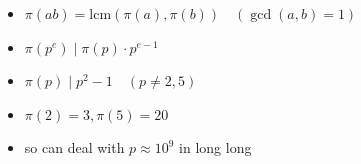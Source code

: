\begin{itemize}
	\item $\pi (ab) = \text{lcm} (\pi (a), \pi(b)) \quad (\gcd (a, b) = 1)$
	\item $\pi (p^e) \mid \pi (p) \cdot p^{e - 1}$
	\item $\pi (p) \mid p^2 - 1 \quad (p \neq 2, 5)$
	\item $\pi (2) = 3, \pi (5) = 20$
	\item so can deal with $p \approx 10^9$ in long long
\end{itemize}